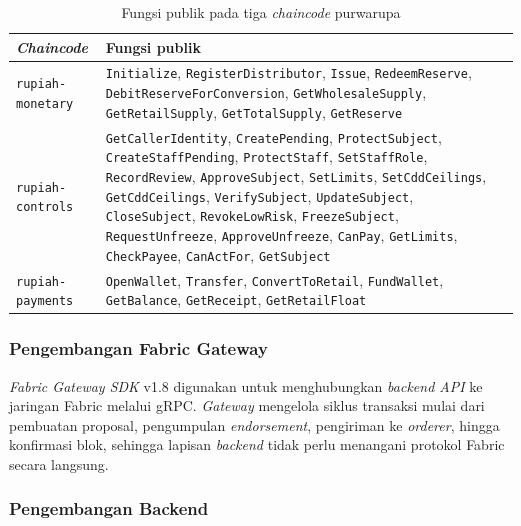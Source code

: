 \begin{table}[H]
    \caption{Fungsi publik pada tiga \textit{chaincode} purwarupa}
    \label{tab:ch3-chaincode-fungsi}
    \centering
    \small
    \begin{tabular}{p{3.6cm} p{8.8cm}}
        \toprule
        \textbf{\textit{Chaincode}} & \textbf{Fungsi publik} \\
        \midrule
        \texttt{rupiah-monetary} & \texttt{Initialize}, \texttt{RegisterDistributor}, \texttt{Issue}, \texttt{RedeemReserve}, \texttt{DebitReserveForConversion}, \texttt{GetWholesaleSupply}, \texttt{GetRetailSupply}, \texttt{GetTotalSupply}, \texttt{GetReserve} \\
        \texttt{rupiah-controls} & \texttt{GetCallerIdentity}, \texttt{CreatePending}, \texttt{ProtectSubject}, \texttt{CreateStaffPending}, \texttt{ProtectStaff}, \texttt{SetStaffRole}, \texttt{RecordReview}, \texttt{ApproveSubject}, \texttt{SetLimits}, \texttt{SetCddCeilings}, \texttt{GetCddCeilings}, \texttt{VerifySubject}, \texttt{UpdateSubject}, \texttt{CloseSubject}, \texttt{RevokeLowRisk}, \texttt{FreezeSubject}, \texttt{RequestUnfreeze}, \texttt{ApproveUnfreeze}, \texttt{CanPay}, \texttt{GetLimits}, \texttt{CheckPayee}, \texttt{CanActFor}, \texttt{GetSubject} \\
        \texttt{rupiah-payments} & \texttt{OpenWallet}, \texttt{Transfer}, \texttt{ConvertToRetail}, \texttt{FundWallet}, \texttt{GetBalance}, \texttt{GetReceipt}, \texttt{GetRetailFloat} \\
        \bottomrule
    \end{tabular}
\end{table}

\subsubsection{Pengembangan Fabric Gateway}

\textit{Fabric Gateway SDK} v1.8 digunakan untuk menghubungkan \textit{backend
	API} ke jaringan Fabric melalui gRPC. \textit{Gateway} mengelola siklus
transaksi mulai dari pembuatan proposal, pengumpulan \textit{endorsement},
pengiriman ke \textit{orderer}, hingga konfirmasi blok, sehingga lapisan
\textit{backend} tidak perlu menangani protokol Fabric secara langsung.

\subsubsection{Pengembangan Backend}

